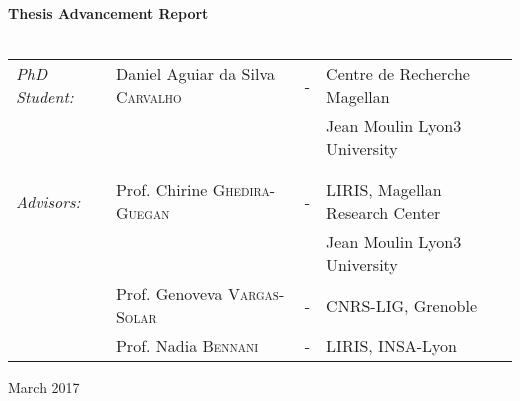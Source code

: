 \begin{titlepage}
\begin{center}
 \\
\vspace*{0.3cm}
 \\
\vspace*{2.5cm}
\noindent \LARGE \textbf{Thesis Advancement Report} \\
\vspace*{0.8cm}
 \\
\end{center}
\vspace*{1cm}
\begin{center}
\begin{tabular}{llcl}
   \large \textit{PhD Student:} & Daniel Aguiar da Silva \textsc{Carvalho} & - & Centre de Recherche Magellan\\
                         &                                          &   & Jean Moulin Lyon3 University\\
                         &&& \\
                         &&& \\
   \large \textit{Advisors:}    & Prof. Chirine \textsc{Ghedira-Guegan}    & - & LIRIS, Magellan Research Center\\
                                &                                          &   & Jean Moulin Lyon3 University\\
      				        & Prof. Genoveva \textsc{Vargas-Solar}	       & - & CNRS-LIG, Grenoble\\
      				        & Prof. Nadia \textsc{Bennani}                 & - & LIRIS, INSA-Lyon\\
\end{tabular}
\end{center}
\vspace*{6cm}
\begin{center}
March 2017
\end{center}
\end{titlepage}
\sloppy